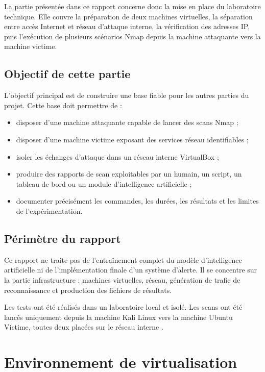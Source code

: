 \documentclass[12pt,a4paper]{report}
\newcommand{\code}[1]{\texttt{\detokenize{#1}}}
\begin{document}
La partie présentée dans ce rapport concerne donc la mise en place du laboratoire technique. Elle couvre la préparation de deux machines virtuelles, la séparation entre accès Internet et réseau d'attaque interne, la vérification des adresses IP, puis l'exécution de plusieurs scénarios Nmap depuis la machine attaquante vers la machine victime.

\section{Objectif de cette partie}
L'objectif principal est de construire une base fiable pour les autres parties du projet. Cette base doit permettre de :
\begin{itemize}
    \item disposer d'une machine attaquante capable de lancer des scans Nmap ;
    \item disposer d'une machine victime exposant des services réseau identifiables ;
    \item isoler les échanges d'attaque dans un réseau interne VirtualBox ;
    \item produire des rapports de scan exploitables par un humain, un script, un tableau de bord ou un module d'intelligence artificielle ;
    \item documenter précisément les commandes, les durées, les résultats et les limites de l'expérimentation.
\end{itemize}

\section{Périmètre du rapport}
Ce rapport ne traite pas de l'entraînement complet du modèle d'intelligence artificielle ni de l'implémentation finale d'un système d'alerte. Il se concentre sur la partie infrastructure : machines virtuelles, réseau, génération de trafic de reconnaissance et production des fichiers de résultats.

Les tests ont été réalisés dans un laboratoire local et isolé. Les scans ont été lancés uniquement depuis la machine Kali Linux vers la machine Ubuntu Victime, toutes deux placées sur le réseau interne \code{lab-cyber}.

\chapter{Environnement de virtualisation}
\end{document}
